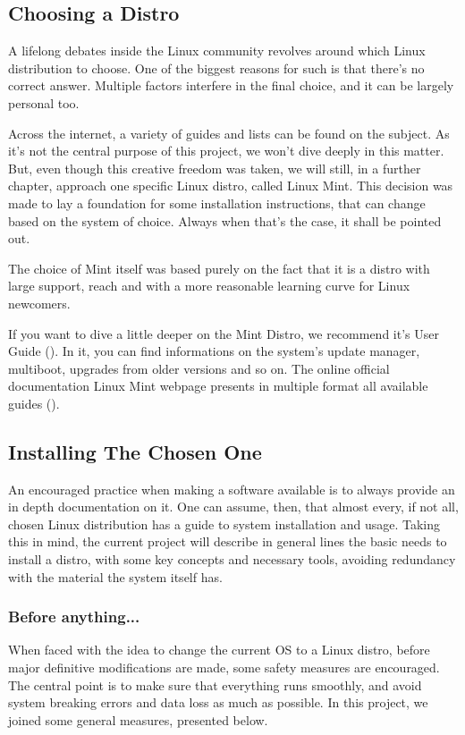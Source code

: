 \documentclass[a4paper,11pt]{article}
\begin{document}
\subsection{Choosing a Distro}
A lifelong debates inside the Linux community revolves around which  Linux
distribution to choose. One of the biggest reasons for such is that there's no
correct answer. Multiple factors interfere in the final choice, and it can be
largely personal too.\par
Across the internet, a variety of guides and lists can be found on the subject.
As it's not the central purpose of this project, we won't dive deeply in this
matter. But, even though this creative freedom was taken, we will still, in
a further chapter, approach one specific Linux distro, called Linux Mint. This
decision was made to lay a foundation for some installation instructions, that
can change based on the system of choice. Always when that's the case, it shall
be pointed out.\par
The choice of Mint itself was based purely on the fact that it is a distro with
large support, reach and with a more reasonable learning curve for Linux
newcomers.

\begin{tipbox}
    If you want to dive a little deeper on the Mint Distro, we recommend it's
    User Guide (\cite{mintUserGuideLinux2024}). In it, you can find informations
    on the system's update manager, multiboot, upgrades from older versions and
    so on. The online official documentation Linux Mint webpage presents in
    multiple format all available guides (\cite{mintLinuxMintDocumentation2025}). 
\end{tipbox}

\subsection{Installing The Chosen One}
An encouraged practice when making a software available is to always provide
an in depth documentation on it. One can assume, then, that almost every, if not
all, chosen Linux distribution has a guide to system installation and usage.
Taking this in mind, the current project will describe in general lines the
basic needs to install a distro, with some key concepts and necessary tools,
avoiding redundancy with the material the system itself has.
\subsubsection{Before anything...}
When faced with the idea to change the current OS to a Linux distro, before
major definitive modifications are made, some safety measures are encouraged.
The central point is to make sure that everything runs smoothly, and avoid
system breaking errors and data loss as much as possible. In this project, we
joined some general measures, presented below.
\end{document}
